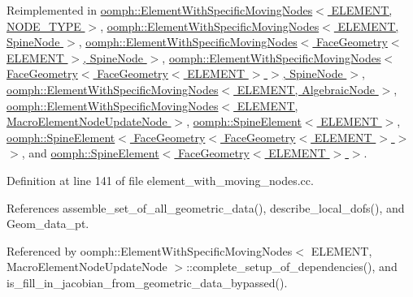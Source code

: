 Reimplemented in \hyperlink{classoomph_1_1ElementWithSpecificMovingNodes_ae54ee1d8772757d72d9df3e7229d8ecf}{oomph\+::\+Element\+With\+Specific\+Moving\+Nodes$<$ E\+L\+E\+M\+E\+N\+T, N\+O\+D\+E\+\_\+\+T\+Y\+P\+E $>$}, \hyperlink{classoomph_1_1ElementWithSpecificMovingNodes_ae54ee1d8772757d72d9df3e7229d8ecf}{oomph\+::\+Element\+With\+Specific\+Moving\+Nodes$<$ E\+L\+E\+M\+E\+N\+T, Spine\+Node $>$}, \hyperlink{classoomph_1_1ElementWithSpecificMovingNodes_ae54ee1d8772757d72d9df3e7229d8ecf}{oomph\+::\+Element\+With\+Specific\+Moving\+Nodes$<$ Face\+Geometry$<$ E\+L\+E\+M\+E\+N\+T $>$, Spine\+Node $>$}, \hyperlink{classoomph_1_1ElementWithSpecificMovingNodes_ae54ee1d8772757d72d9df3e7229d8ecf}{oomph\+::\+Element\+With\+Specific\+Moving\+Nodes$<$ Face\+Geometry$<$ Face\+Geometry$<$ E\+L\+E\+M\+E\+N\+T $>$ $>$, Spine\+Node $>$}, \hyperlink{classoomph_1_1ElementWithSpecificMovingNodes_ae54ee1d8772757d72d9df3e7229d8ecf}{oomph\+::\+Element\+With\+Specific\+Moving\+Nodes$<$ E\+L\+E\+M\+E\+N\+T, Algebraic\+Node $>$}, \hyperlink{classoomph_1_1ElementWithSpecificMovingNodes_ae54ee1d8772757d72d9df3e7229d8ecf}{oomph\+::\+Element\+With\+Specific\+Moving\+Nodes$<$ E\+L\+E\+M\+E\+N\+T, Macro\+Element\+Node\+Update\+Node $>$}, \hyperlink{classoomph_1_1SpineElement_a867b5e4eb64d60da9585f8a791fbac36}{oomph\+::\+Spine\+Element$<$ E\+L\+E\+M\+E\+N\+T $>$}, \hyperlink{classoomph_1_1SpineElement_a867b5e4eb64d60da9585f8a791fbac36}{oomph\+::\+Spine\+Element$<$ Face\+Geometry$<$ Face\+Geometry$<$ E\+L\+E\+M\+E\+N\+T $>$ $>$ $>$}, and \hyperlink{classoomph_1_1SpineElement_a867b5e4eb64d60da9585f8a791fbac36}{oomph\+::\+Spine\+Element$<$ Face\+Geometry$<$ E\+L\+E\+M\+E\+N\+T $>$ $>$}.



Definition at line 141 of file element\+\_\+with\+\_\+moving\+\_\+nodes.\+cc.



References assemble\+\_\+set\+\_\+of\+\_\+all\+\_\+geometric\+\_\+data(), describe\+\_\+local\+\_\+dofs(), and Geom\+\_\+data\+\_\+pt.



Referenced by oomph\+::\+Element\+With\+Specific\+Moving\+Nodes$<$ E\+L\+E\+M\+E\+N\+T, Macro\+Element\+Node\+Update\+Node $>$\+::complete\+\_\+setup\+\_\+of\+\_\+dependencies(), and is\+\_\+fill\+\_\+in\+\_\+jacobian\+\_\+from\+\_\+geometric\+\_\+data\+\_\+bypassed().

\mbox{\label{classoomph_1_1ElementWithMovingNodes_ab80f172afa65872255959c1af3fb7809}} 
